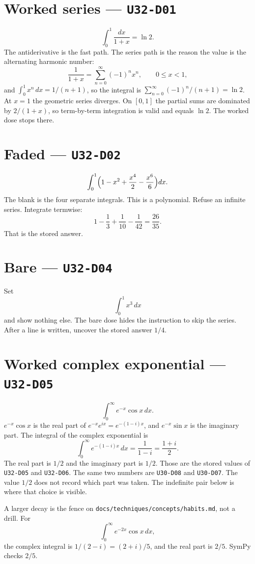 \section{Worked series --- \texttt{U32-D01}}
\[
\int_0^1\frac{dx}{1+x}=\ln 2.
\]
The antiderivative is the fast path. The series path is the reason the value is the alternating harmonic number:
\[
\frac{1}{1+x}=\sum_{n=0}^{\infty}(-1)^n x^n,\qquad 0\le x<1,
\]
and $\int_0^1 x^n\,dx=1/(n+1)$, so the integral is $\sum_{n=0}^{\infty}(-1)^n/(n+1)=\ln 2$. At $x=1$ the geometric series diverges. On $[0,1]$ the partial sums are dominated by $2/(1+x)$, so term-by-term integration is valid and equals $\ln 2$. The worked dose stops there.

\section{Faded --- \texttt{U32-D02}}
\[
\int_0^1\Bigl(1-x^2+\frac{x^4}{2}-\frac{x^6}{6}\Bigr)dx.
\]
The blank is the four separate integrals. This is a polynomial. Refuse an infinite series. Integrate termwise:
\[
1-\frac13+\frac{1}{10}-\frac{1}{42}=\frac{26}{35}.
\]
That is the stored answer.

\section{Bare --- \texttt{U32-D04}}
Set
\[
\int_0^1 x^3\,dx
\]
and show nothing else. The bare dose hides the instruction to skip the series. After a line is written, uncover the stored answer $1/4$.

\section{Worked complex exponential --- \texttt{U32-D05}}
\[
\int_0^{\infty}e^{-x}\cos x\,dx.
\]
$e^{-x}\cos x$ is the real part of $e^{-x}e^{ix}=e^{-(1-i)x}$, and $e^{-x}\sin x$ is the imaginary part. The integral of the complex exponential is
\[
\int_0^{\infty}e^{-(1-i)x}\,dx=\frac{1}{1-i}=\frac{1+i}{2}.
\]
The real part is $1/2$ and the imaginary part is $1/2$. Those are the stored values of \texttt{U32-D05} and \texttt{U32-D06}. The same two numbers are \texttt{U30-D08} and \texttt{U30-D07}. The value $1/2$ does not record which part was taken. The indefinite pair below is where that choice is visible.

A larger decay is the fence on \texttt{docs/techniques/concepts/habits.md}, not a drill. For
\[
\int_0^{\infty}e^{-2x}\cos x\,dx,
\]
the complex integral is $1/(2-i)=(2+i)/5$, and the real part is $2/5$. SymPy checks $2/5$.

